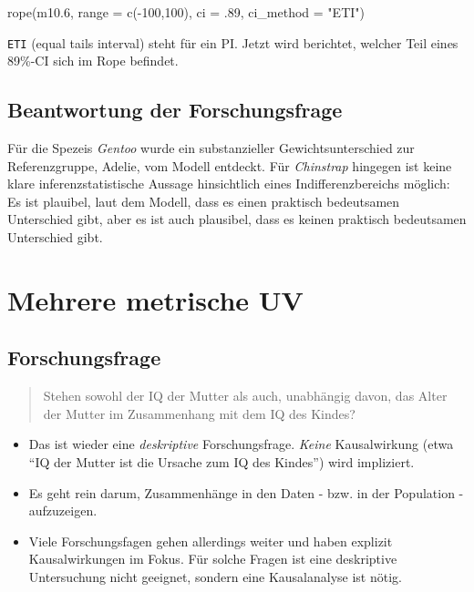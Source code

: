 \documentclass[
  a4paper,
  DIV=11]{scrreprt}
\newenvironment{Shaded}{\begin{snugshade}}{\end{snugshade}}
\newcommand{\AttributeTok}[1]{\textcolor[rgb]{0.40,0.45,0.13}{#1}}
\newcommand{\DecValTok}[1]{\textcolor[rgb]{0.68,0.00,0.00}{#1}}
\newcommand{\FloatTok}[1]{\textcolor[rgb]{0.68,0.00,0.00}{#1}}
\newcommand{\FunctionTok}[1]{\textcolor[rgb]{0.28,0.35,0.67}{#1}}
\newcommand{\NormalTok}[1]{\textcolor[rgb]{0.00,0.23,0.31}{#1}}
\newcommand{\SpecialCharTok}[1]{\textcolor[rgb]{0.37,0.37,0.37}{#1}}
\newcommand{\StringTok}[1]{\textcolor[rgb]{0.13,0.47,0.30}{#1}}
\providecommand{\tightlist}{%
  \setlength{\itemsep}{0pt}\setlength{\parskip}{0pt}}\usepackage{longtable,booktabs,array}
\theoremstyle{definition}
\theoremstyle{remark}
\begin{document}
\begin{Shaded}
\begin{Highlighting}[]
\FunctionTok{rope}\NormalTok{(m10}\FloatTok{.6}\NormalTok{, }\AttributeTok{range =} \FunctionTok{c}\NormalTok{(}\SpecialCharTok{{-}}\DecValTok{100}\NormalTok{,}\DecValTok{100}\NormalTok{), }\AttributeTok{ci =}\NormalTok{ .}\DecValTok{89}\NormalTok{, }\AttributeTok{ci\_method =} \StringTok{"ETI"}\NormalTok{)}
\end{Highlighting}
\end{Shaded}

\texttt{ETI} (equal tails interval) steht für ein PI. Jetzt wird
berichtet, welcher Teil eines 89\%-CI sich im Rope befindet.

\hypertarget{beantwortung-der-forschungsfrage}{%
\subsection{Beantwortung der
Forschungsfrage}\label{beantwortung-der-forschungsfrage}}

Für die Spezeis \emph{Gentoo} wurde ein substanzieller
Gewichtsunterschied zur Referenzgruppe, Adelie, vom Modell entdeckt. Für
\emph{Chinstrap} hingegen ist keine klare inferenzstatistische Aussage
hinsichtlich eines Indifferenzbereichs möglich: Es ist plauibel, laut
dem Modell, dass es einen praktisch bedeutsamen Unterschied gibt, aber
es ist auch plausibel, dass es keinen praktisch bedeutsamen Unterschied
gibt.

\hypertarget{mehrere-metrische-uv}{%
\section{Mehrere metrische UV}\label{mehrere-metrische-uv}}

\hypertarget{forschungsfrage-3}{%
\subsection{Forschungsfrage}\label{forschungsfrage-3}}

\begin{quote}
Stehen sowohl der IQ der Mutter als auch, unabhängig davon, das Alter
der Mutter im Zusammenhang mit dem IQ des Kindes?
\end{quote}

\begin{itemize}
\tightlist
\item
  Das ist wieder eine \emph{deskriptive} Forschungsfrage. \emph{Keine}
  Kausalwirkung (etwa ``IQ der Mutter ist die Ursache zum IQ des
  Kindes'') wird impliziert.
\item
  Es geht rein darum, Zusammenhänge in den Daten - bzw. in der
  Population - aufzuzeigen.
\item
  Viele Forschungsfagen gehen allerdings weiter und haben explizit
  Kausalwirkungen im Fokus. Für solche Fragen ist eine deskriptive
  Untersuchung nicht geeignet, sondern eine Kausalanalyse ist nötig.
\end{itemize}
\end{document}
